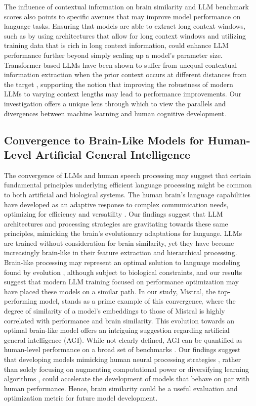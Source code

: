 The influence of contextual information on brain similarity and LLM benchmark scores also points to specific avenues that may improve model performance on language tasks. Ensuring that models are able to extract long context windows, such as by using architectures that allow for long context windows \cite{xiong2023effective} and utilizing training data that is rich in long context information, could enhance LLM performance further beyond simply scaling up a model's parameter size. Transformer-based LLMs have been shown to suffer from unequal contextual information extraction when the prior context occurs at different distances from the target \cite{liu2023lost}, supporting the notion that improving the robustness of modern LLMs to varying context lengths may lead to performance improvements. Our investigation offers a unique lens through which to view the parallels and divergences between machine learning and human cognitive development.

\subsection{Convergence to Brain-Like Models for Human-Level Artificial General Intelligence}

The convergence of LLMs and human speech processing may suggest that certain fundamental principles underlying efficient language processing might be common to both artificial and biological systems. The human brain's language capabilities have developed as an adaptive response to complex communication needs, optimizing for efficiency and versatility \cite{pinker1990natural}. Our findings suggest that LLM architectures and processing strategies are gravitating towards these same principles, mimicking the brain’s evolutionary adaptations for language. LLMs are trained without consideration for brain similarity, yet they have become increasingly brain-like in their feature extraction and hierarchical processing. Brain-like processing may represent an optimal solution to language modeling found by evolution \cite{deacon1997symbolic}, although subject to biological constraints, and our results suggest that modern LLM training focused on performance optimization may have placed these models on a similar path. In our study, Mistral, the top-performing model, stands as a prime example of this convergence, where the degree of similarity of a model’s embeddings to those of Mistral is highly correlated with performance and brain similarity. This evolution towards an optimal brain-like model offers an intriguing suggestion regarding artificial general intelligence (AGI). While not clearly defined, AGI can be quantified as human-level performance on a broad set of benchmarks \cite{goertzel2014artificial}. Our findings suggest that developing models mimicking human neural processing strategies \cite{zhao2023brain}, rather than solely focusing on augmenting computational power or diversifying learning algorithms \cite{zhao2023survey}, could accelerate the development of models that behave on par with human performance. Hence, brain similarity could be a useful evaluation and optimization metric for future model development.

